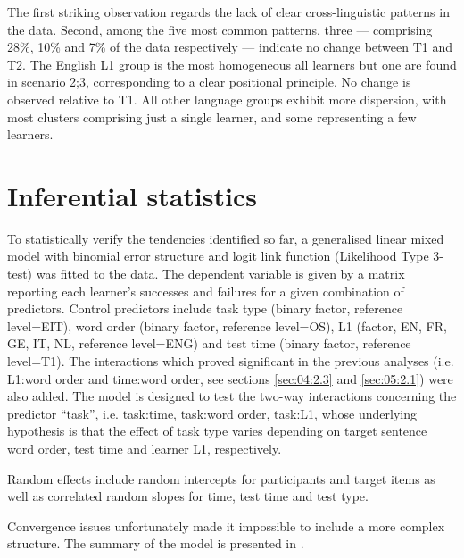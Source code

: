 The first striking observation regards the lack of clear cross-linguistic patterns in the data. Second, among the five most common patterns, three — comprising 28\%, 10\% and 7\% of the data respectively — indicate no change between T1 and T2. The English L1 group is the most homogeneous all learners but one are found in scenario 2;3, corresponding to a clear positional principle. No change is observed relative to T1. All other language groups exhibit more dispersion, with most clusters comprising just a single learner, and some representing a few learners. 

\section{Inferential statistics}\label{sec:06:4}

To statistically verify the tendencies identified so far, a generalised linear mixed model with binomial error structure and logit link function (Likelihood Type 3-test) was fitted to the data. The dependent variable is given by a matrix reporting each learner’s successes and failures for a given combination of predictors. Control predictors include task type (binary factor, reference level=EIT), word order (binary factor, reference level=OS), L1 (factor, EN, FR, GE, IT, NL, reference level=ENG) and test time (binary factor, reference level=T1). The interactions which proved significant in the previous analyses (i.e. L1:word order and time:word order, see sections \ref{sec:04:2.3} and \ref{sec:05:2.1}) were also added. The model is designed to test the two-way interactions concerning the predictor “task”, i.e. task:time, task:word order, task:L1, whose underlying hypothesis is that the effect of task type varies depending on target sentence word order, test time and learner L1, respectively. 

Random effects include random intercepts for participants and target items as well as correlated random slopes for time, test time and test type. 

Convergence issues unfortunately made it impossible to include a more complex structure. The summary of the model is presented in .

